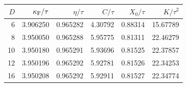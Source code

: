 \begin{tabular}{rrrrrr}\toprule
$D$ & $\kappa_{\rm F}/\tau$ & $\eta/\tau$ & $C/\tau$ & $X_0/\tau$ & $K/\tau^2$\\\midrule
6 & 3.906250 & 0.965282 & 4.30792 & 0.88314 & 15.67789 \\
8 & 3.950050 & 0.965288 & 5.95775 & 0.81311 & 22.46279 \\
10 & 3.950180 & 0.965291 & 5.93696 & 0.81525 & 22.37857 \\
12 & 3.950196 & 0.965292 & 5.92781 & 0.81526 & 22.34253 \\
16 & 3.950208 & 0.965292 & 5.92911 & 0.81527 & 22.34774 \\
\bottomrule\end{tabular}
